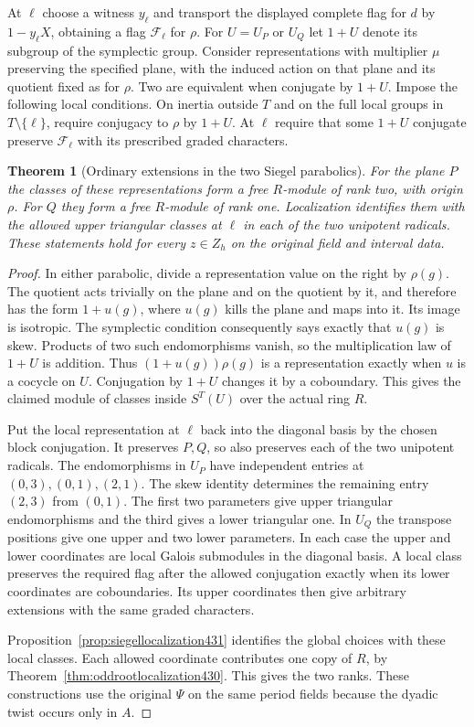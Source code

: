 \documentclass[a4paper,11pt]{article}
\newtheorem{theorem}[proposition]{Theorem}
\theoremstyle{definition}
\theoremstyle{remark}
\numberwithin{equation}{section}
\begin{document}
At \(\ell\) choose a witness \(y_\ell\) and transport the
displayed complete flag for \(d\) by \(1-y_\ell X\), obtaining
a flag \(\mathcal F_\ell\) for \(\rho\). For \(U=U_P\) or
\(U_Q\) let \(1+U\) denote its subgroup of the symplectic group.
Consider representations with multiplier \(\mu\) preserving the
specified plane, with the induced action on that plane and its
quotient fixed as for \(\rho\). Two are equivalent when
conjugate by \(1+U\). Impose the following local conditions.
On inertia outside \(T\) and on the full local groups in
\(T\setminus\{\ell\}\), require conjugacy to \(\rho\) by
\(1+U\). At \(\ell\) require that some \(1+U\) conjugate
preserve \(\mathcal F_\ell\) with its prescribed graded characters.

\begin{theorem}[Ordinary extensions in the two Siegel parabolics]\leavevmode
\label{thm:siegelclasses431}
For the plane \(P\) the classes of these representations form a
free \(R\)-module of rank two, with origin \(\rho\).
For \(Q\) they form a free \(R\)-module of rank one.
Localization identifies them with the allowed upper triangular
classes at \(\ell\) in each of the two unipotent radicals.
These statements hold for every \(z\in Z_h\) on the original
field and interval data.
\end{theorem}
\begin{proof}
In either parabolic, divide a representation value on the right
by \(\rho(g)\). The quotient acts trivially on the plane and
on the quotient by it, and therefore has the form \(1+u(g)\),
where \(u(g)\) kills the plane and maps into it. Its image
is isotropic. The symplectic condition consequently says exactly
that \(u(g)\) is skew. Products of two such endomorphisms
vanish, so the multiplication law of \(1+U\) is addition.
Thus \((1+u(g))\rho(g)\) is a representation exactly when
\(u\) is a cocycle on \(U\). Conjugation by \(1+U\) changes
it by a coboundary. This gives the claimed module of classes
inside \(S^T(U)\) over the actual ring \(R\).

Put the local representation at \(\ell\) back into the
diagonal basis by the chosen block conjugation. It preserves
\(P,Q\), so also preserves each of the two unipotent radicals.
The endomorphisms in \(U_P\) have independent entries at
\((0,3),(0,1),(2,1)\). The skew identity determines the
remaining entry \((2,3)\) from \((0,1)\). The first two
parameters give upper triangular endomorphisms and the third
gives a lower triangular one. In \(U_Q\) the transpose
positions give one upper and two lower parameters. In each
case the upper and lower coordinates are local Galois
submodules in the diagonal basis. A local class preserves
the required flag after the allowed conjugation exactly when
its lower coordinates are coboundaries. Its upper coordinates
then give arbitrary extensions with the same graded characters.

Proposition~\ref{prop:siegellocalization431} identifies
the global choices with these local classes. Each allowed
coordinate contributes one copy of \(R\), by
Theorem~\ref{thm:oddrootlocalization430}. This gives the two
ranks. These constructions use the original \(\Psi\) on the
same period fields because the dyadic twist occurs only in \(A\).
\end{proof}
\end{document}
